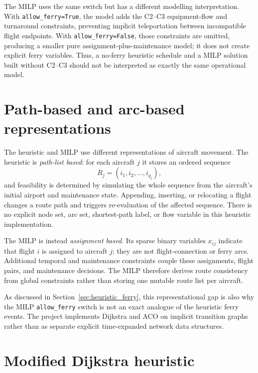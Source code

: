 The MILP uses the same switch but has a different modelling interpretation. With \texttt{allow\_ferry=True}, the model adds the C2--C3 equipment-flow and turnaround constraints, preventing implicit teleportation between incompatible flight endpoints. With \texttt{allow\_ferry=False}, those constraints are omitted, producing a smaller pure assignment-plus-maintenance model; it does not create explicit ferry variables. Thus, a no-ferry heuristic schedule and a MILP solution built without C2--C3 should not be interpreted as exactly the same operational model.

\section{Path-based and arc-based representations}
\label{sec:heuristic_path_arc}

The heuristic and MILP use different representations of aircraft movement. The heuristic is \emph{path-list based}: for each aircraft $j$ it stores an ordered sequence
\begin{equation}
    R_j=(i_1,i_2,\ldots,i_{q_j}),
\end{equation}
and feasibility is determined by simulating the whole sequence from the aircraft’s initial airport and maintenance state. Appending, inserting, or relocating a flight changes a route path and triggers re-evaluation of the affected sequence. There is no explicit node set, arc set, shortest-path label, or flow variable in this heuristic implementation.

The MILP is instead \emph{assignment based}. Its sparse binary variables
$x_{ij}$ indicate that flight $i$ is assigned to aircraft $j$; they are not
flight-connection or ferry arcs. Additional temporal and maintenance
constraints couple these assignments, flight pairs, and maintenance decisions.
The MILP therefore derives route consistency from global constraints rather
than storing one mutable route list per aircraft.

As discussed in Section~\ref{sec:heuristic_ferry}, this representational gap is
also why the MILP \texttt{allow\_ferry} switch is not an exact analogue of the
heuristic ferry events. The project implements Dijkstra and ACO on implicit
transition graphs rather than as separate explicit time-expanded network data
structures.

\section{Modified Dijkstra heuristic}
\label{sec:heuristic_network}

